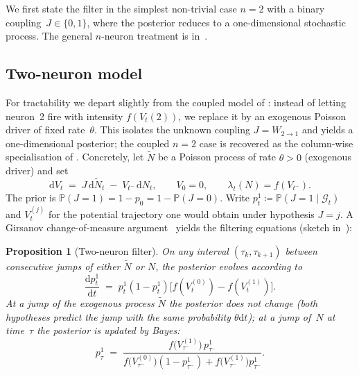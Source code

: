 \documentclass[11pt,a4paper]{article}
\newtheorem{proposition}[theorem]{Proposition}
\theoremstyle{definition}
\newcommand{\Prob}{\mathbb{P}}
\newcommand{\cG}{\mathcal{G}}
\begin{document}
We first state the filter in the simplest non-trivial case $n = 2$ with
a binary coupling~$J \in \{0, 1\}$, where the posterior reduces to a
one-dimensional stochastic process. The general $n$-neuron treatment is
in~.

\subsection{Two-neuron model}
\label{subsec:two-neuron}

For tractability we depart slightly from the coupled model of : instead of letting neuron~2 fire with intensity $f(V_t(2))$, we replace it by an exogenous Poisson driver of fixed rate~$\theta$. This isolates the unknown coupling $J = W_{2 \to 1}$ and yields a one-dimensional posterior; the coupled $n = 2$ case is recovered as the column-wise specialisation of . Concretely, let $\widetilde N$ be a Poisson process of rate $\theta > 0$ (exogenous
driver) and set
\begin{equation}
    \mathrm{d} V_t \;=\; J \,\mathrm{d} \widetilde N_t \;-\; V_{t^-}
    \,\mathrm{d} N_t,\qquad V_0 = 0,
    \qquad
    \lambda_t(N) = f(V_{t^-}).
    \label{eq:two-neuron}
\end{equation}
The prior is $\Prob(J = 1) = 1 - p_0 = 1 - \Prob(J = 0)$. Write
$p_t^1 \coloneqq \Prob(J = 1 \mid \cG_t)$ and $V_t^{(j)}$ for the
potential trajectory one would obtain under hypothesis $J = j$. A
Girsanov change-of-measure argument~\citep{Bremaud1981}
yields the filtering equations (sketch in~):

\begin{proposition}[Two-neuron filter]
\label{prop:filter-2}
On any interval $(\tau_k, \tau_{k+1})$ between consecutive jumps of
either $\widetilde N$ or $N$, the posterior evolves according to
\begin{equation}
    \frac{\mathrm{d} p_t^1}{\mathrm{d} t} \;=\; p_t^1 (1 - p_t^1)
    \bigl[ f(V_t^{(0)}) - f(V_t^{(1)}) \bigr].
    \label{eq:ode-posterior}
\end{equation}
At a jump of the exogenous process $\widetilde N$ the posterior does
not change (both hypotheses predict the jump with the same probability
$\theta \mathrm{d} t$); at a jump of~$N$ at time~$\tau$ the posterior
is updated by Bayes:
\begin{equation}
    p_\tau^1 \;=\; \frac{f\bigl( V_{\tau^-}^{(1)} \bigr) \, p_{\tau^-}^1}
    {f\bigl( V_{\tau^-}^{(0)} \bigr) (1 - p_{\tau^-}^1) +
     f\bigl( V_{\tau^-}^{(1)} \bigr) p_{\tau^-}^1}.
    \label{eq:jump-posterior}
\end{equation}
\end{proposition}
\end{document}
